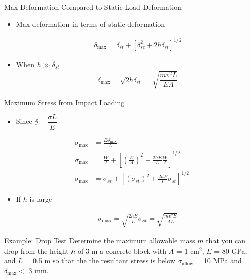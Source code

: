\documentclass[10pt, svgnames]{beamer}
\begin{document}
\begin{frame}[label={sec:org2215add}]{Max Deformation Compared to Static Load Deformation}
\begin{itemize}
\item Max deformation in terms of static deformation

\begin{gather*}
  \delta_{\max} = \delta_{st} + \left[ \delta_{st}^2 + 2h \delta_{st} \right]^{1/2}
\end{gather*}

\item When \(h \gg \delta_{st}\)
\begin{gather*}
  \delta_{\max} = \sqrt{2h \delta_{st}} = \sqrt{ \dfrac{mv^2 L}{EA} }
\end{gather*}
\end{itemize}
\end{frame}

\begin{frame}[label={sec:org7a0340a}]{Maximum Stress from Impact Loading}
\begin{itemize}
\item Since \(\delta = \dfrac{\sigma L}{E}\)
\end{itemize}

\begin{align*}
    \sigma_{\max} &= \frac{E\delta_{\max}}{L} \\
    \sigma_{\max} &= \frac{W}{A} + \left[ \left( \frac{W}{A} \right)^2 + \frac{2hE}{L}\frac{W}{A} \right]^{1/2} \\
    \sigma_{\max} &= \sigma_{st} + \left[ \left( \sigma_{st} \right)^2 + \frac{2hE}{L} \sigma_{st} \right]^{1/2}
\end{align*}

\begin{itemize}
\item If \(h\) is large

\begin{align*}
  \sigma_{\max} = \sqrt{ \frac{2hE}{L} \sigma_{st} } = \sqrt{ \frac{mv^2 E}{AL} }
\end{align*}
\end{itemize}
\end{frame}

\begin{frame}[label={sec:orge1bd175}]{Example: Drop Test}
Determine the maximum allowable mass \(m\) that you
can drop from the height \(h\) of 3 m a concrete block with \(A\) = 1
cm\(^{2}\), \(E\) = 80 GPa, and \(L\) = 0.5 m so that the the resultant
stress is below \(\sigma_{\text{allow}}\) = 10 MPa and
\(\delta_{\max} <\) 3 mm.
\end{frame}
\end{document}
